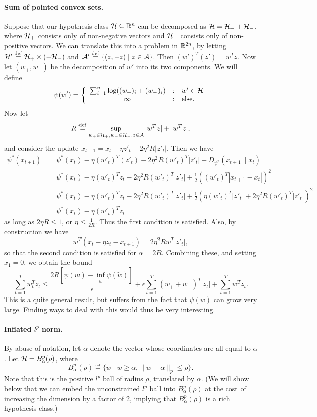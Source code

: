 \documentclass[11pt]{article}
\begin{document}
\paragraph{Sum of pointed convex sets.} Suppose that our hypothesis class 
$\mathcal{H} \subseteq \mathbb{R}^n$ can be decomposed as $\mathcal{H} = \mathcal{H}_+ + \mathcal{H}_-$, where $\mathcal{H}_+$ consists 
only of non-negative vectors and $\mathcal{H}_-$ consists only of non-positive vectors. 
We can translate this into a problem in $\mathbb{R}^{2n}$, by letting $\mathcal{H}' \stackrel{\mathrm{def}}{=} \mathcal{H}_+ \times (-\mathcal{H}_-)$ 
and $\mathcal{A}' \stackrel{\mathrm{def}}{=} \{(z, -z) \mid z \in \mathcal{A}\}$. Then $(w')^T(z') = w^Tz$. Now 
let $(w_+, w_-)$ be the decomposition of $w'$ into its two components. We will 
define
\[ \psi(w') = \left\{ \begin{array}{ccl} \sum_{i=1}^n \log((w_+)_i + (w_-)_i) & : & w' \in \mathcal{H} \\ \infty & : & \mathrm{else}. \end{array} \right. \]
Now let 
\[ R \stackrel{\mathrm{def}}{=} \sup\limits_{w_+ \in \mathcal{H}_+, w_- \in \mathcal{H}_-, z \in \mathcal{A}}  |w_+^Tz| + |w_-^Tz|, \]
and consider the update $x_{t+1} = x_t - \eta z'_t - 2\eta^2 R |z'_t|$. Then we have
\begin{align*}
\psi^*(x_{t+1}) &= \psi^*(x_t) - \eta (w'_t)^T(z'_t) - 2\eta^2R (w'_t)^T|z'_t| + D_{\psi^*}(x_{t+1} \| x_t) \\
 &= \psi^*(x_t) - \eta (w'_t)^Tz_t - 2\eta^2R (w'_t)^T|z'_t| + \frac{1}{2}((w'_t)^T|x_{t+1}-x_t|)^2 \\
 &= \psi^*(x_t) - \eta (w'_t)^Tz_t - 2\eta^2R (w'_t)^T|z'_t| + \frac{1}{2}(\eta (w'_t)^T|z'_t| + 2\eta^2R (w'_t)^T|z'_t|)^2 \\
 &= \psi^*(x_t) - \eta (w'_t)^Tz_t
\end{align*}
as long as $2\eta R \leq 1$, or $\eta \leq \frac{1}{2R}$. Thus the first condition is 
satisfied. Also, by construction we have 
\[ w^T(x_t - \eta z_t - x_{t+1}) = 2\eta^2 R w^T|z'_t|, \]
so that the second condition is satisfied for $\alpha = 2R$. Combining these, and 
setting $x_1 = 0$, we obtain the bound
\[ \sum_{t=1}^T w_t^Tz_t \leq \frac{2R[\psi(w) - \inf_{\tilde{w}} \psi(\tilde{w})]}{\epsilon} + \epsilon \sum_{t=1}^T (w_+ + w_-)^T|z_t| + \sum_{t=1}^T w^Tz_t. \]
This is a quite general result, but suffers from the fact that $\psi(w)$ can grow very large. 
Finding ways to deal with this would thus be very interesting.

\paragraph{Inflated $l^p$ norm.} By abuse of notation, let $\alpha$ denote the vector 
whose coordinates are all equal to $\alpha$. Let $\mathcal{H} = B_{\alpha}^p(\rho)$, where 
\[ B_{\alpha}^p(\rho) \eqdef \{w \mid w \geq \alpha, \|w-\alpha\|_p \leq \rho \}. \]
Note that this is the positive $l^p$ ball of radius $\rho$, translated by $\alpha$. 
(We will show below that we can embed the unconstrained $l^p$ ball into $B_{\alpha}^p(\rho)$ 
at the cost of increasing the dimension by a factor of 2, implying that 
$B_{\alpha}^p(\rho)$ is a rich hypothesis class.) 
\end{document}
